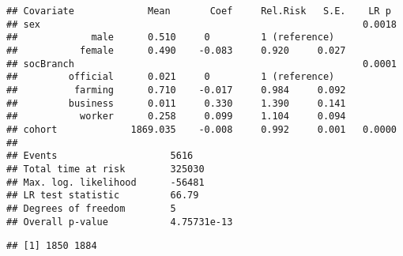 \documentclass[
]{book}
\newenvironment{Shaded}{\begin{snugshade}}{\end{snugshade}}
\newcommand{\AttributeTok}[1]{\textcolor[rgb]{0.77,0.63,0.00}{#1}}
\newcommand{\CommentTok}[1]{\textcolor[rgb]{0.56,0.35,0.01}{\textit{#1}}}
\newcommand{\DecValTok}[1]{\textcolor[rgb]{0.00,0.00,0.81}{#1}}
\newcommand{\FunctionTok}[1]{\textcolor[rgb]{0.00,0.00,0.00}{#1}}
\newcommand{\NormalTok}[1]{#1}
\newcommand{\OtherTok}[1]{\textcolor[rgb]{0.56,0.35,0.01}{#1}}
\newcommand{\SpecialCharTok}[1]{\textcolor[rgb]{0.00,0.00,0.00}{#1}}
\begin{document}
\begin{verbatim}
## Covariate             Mean       Coef     Rel.Risk   S.E.    LR p
## sex                                                         0.0018 
##             male      0.510     0         1 (reference)
##           female      0.490    -0.083     0.920     0.027
## socBranch                                                   0.0001 
##         official      0.021     0         1 (reference)
##          farming      0.710    -0.017     0.984     0.092
##         business      0.011     0.330     1.390     0.141
##           worker      0.258     0.099     1.104     0.094
## cohort             1869.035    -0.008     0.992     0.001   0.0000 
## 
## Events                    5616 
## Total time at risk        325030 
## Max. log. likelihood      -56481 
## LR test statistic         66.79 
## Degrees of freedom        5 
## Overall p-value           4.75731e-13
\end{verbatim}

\begin{Shaded}
\end{Shaded}

\begin{verbatim}
## [1] 1850 1884
\end{verbatim}

\begin{Shaded}
\end{Shaded}
\end{document}
